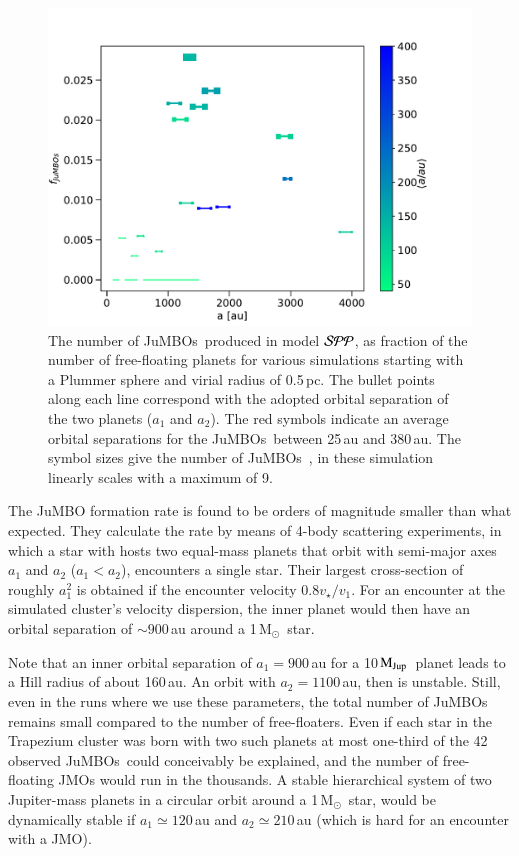 \documentclass[submission,phys]{lib/SciPost}
\newcommand{\MSun}{\mbox{$\mathrm{{M}}_\odot$}}
\newcommand{\MJup}{\mbox{$\mathrm{{M}}_{\rm Jup}$}}
\newcommand{\jumbos}{\mbox{JuMBOs}}
\begin{document}
\begin{figure}
    \centering
        \includegraphics[width=.75\columnwidth]{figures/fig_fjumbos_from_psystems.pdf}
        \caption{The number of \jumbos\ produced in model ${\cal SPP}$,
          as fraction of the number of free-floating planets for
          various simulations starting with a Plummer sphere and
          virial radius of 0.5\,pc.  The bullet points along each line
          correspond with the adopted orbital separation of the two
          planets ($a_1$ and $a_2$).  The red symbols indicate an
          average orbital separations for the \jumbos\ between 25\,au
          and 380\,au.  The symbol sizes give the number of \jumbos\ ,
          in these simulation linearly scales with a maximum of 9.  }
         \label{Fig:fjumbos_from_PP}
\end{figure}

The JuMBO formation rate is found to be orders of magnitude smaller
than what \cite{2023arXiv231006016W} expected.  They calculate the
rate by means of 4-body scattering experiments, in which a star with
hosts two equal-mass planets that orbit with semi-major axes $a_1$ and
$a_2$ ($a_1 < a_2$), encounters a single star. Their largest
cross-section of roughly $a_1^2$ is obtained if the encounter velocity
$0.8v_\star/v_1$. For an encounter at the simulated cluster's velocity
dispersion, the inner planet would then have an orbital separation of
$\sim 900$\,au around a 1\,\MSun\, star.

Note that an inner orbital separation of $a_1=900$\,au for a
10\,\MJup\, planet leads to a Hill radius of about 160\,au. An orbit
with $a_2=1100$\,au, then is unstable.  Still, even in the runs where
we use these parameters, the total number of \jumbos\, remains small
compared to the number of free-floaters.  Even if each star in the
Trapezium cluster was born with two such planets at most one-third of
the 42 observed \jumbos\, could conceivably be explained, and the
number of free-floating JMOs would run in the thousands.  A stable
hierarchical system of two Jupiter-mass planets in a circular orbit
around a 1\,\MSun\, star, would be dynamically stable if $a_1 \simeq
120$\,au and $a_2 \simeq 210$\,au (which is hard for an encounter with
a JMO).
\end{document}
